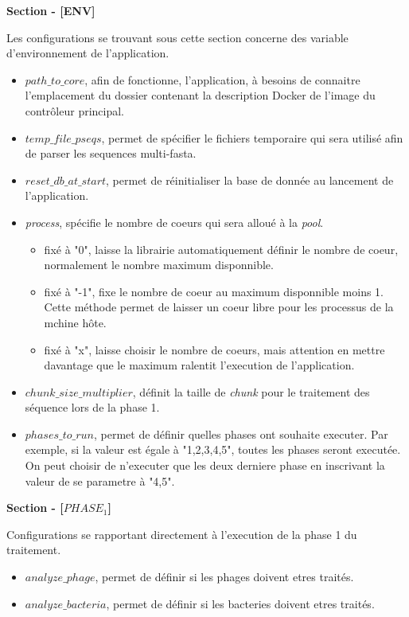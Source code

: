\textbf{Section - [ENV]}

Les configurations se trouvant sous cette section concerne des variable d'environnement de l'application.

\begin{itemize}
\item \emph{$path\_to\_core$}, afin de fonctionne, l'application, à besoins de connaitre l'emplacement du dossier contenant la description Docker de l'image du contrôleur principal.
\item \emph{$temp\_file\_pseqs$}, permet de spécifier le fichiers temporaire qui sera utilisé afin de parser les sequences multi-fasta. 
\item \emph{$reset\_db\_at\_start$}, permet de réinitialiser la base de donnée au lancement de l'application.
\item \emph{process}, spécifie le nombre de coeurs qui sera alloué à la \emph{pool}. 
\begin{itemize}
\item fixé à "0", laisse la librairie automatiquement définir le nombre de coeur, normalement le nombre maximum disponnible.
\item fixé à "-1", fixe le nombre de coeur au maximum disponnible moins 1. Cette méthode permet de laisser un coeur libre pour les processus de la mchine hôte.
\item fixé à "x", laisse choisir le nombre de coeurs, mais attention en mettre davantage que le maximum ralentit l'execution de l'application.
\end{itemize}
\item \emph{$chunk\_size\_multiplier$}, définit la taille de \emph{chunk} pour le traitement des séquence lors de la phase 1.
\item \emph{$phases\_to\_run$}, permet de définir quelles phases ont souhaite executer. Par exemple, si la valeur est égale à "1,2,3,4,5", toutes les phases seront executée. On peut choisir de n'executer que les deux derniere phase en inscrivant la valeur de se parametre à "4,5".
\end{itemize}

\textbf{Section - [$PHASE_1$]}

Configurations se rapportant directement à l'execution de la phase 1 du traitement.

\begin{itemize}
\item \emph{$analyze\_phage$}, permet de définir si les phages doivent etres traités.
\item \emph{$analyze\_bacteria$}, permet de définir si les bacteries doivent etres traités.
\end{itemize}

